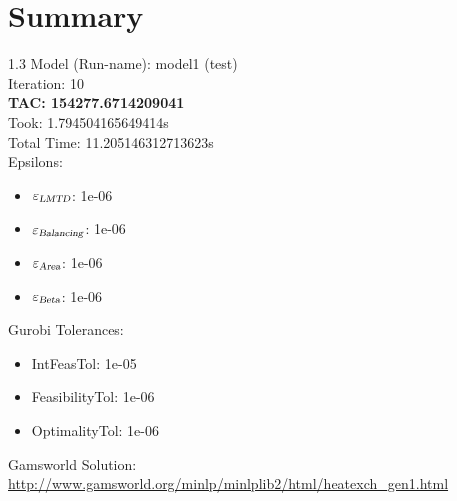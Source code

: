 \documentclass{article}%
\begin{document}
%
\normalsize%
\section{Summary}%
\thispagestyle{plain}%
\begin{spacing}{1.3}%
\Large%
Model (Run-name): model1 (test)\\%
Iteration: 10\\%
\textbf{TAC: 154277.6714209041}\\%
Took: 1.794504165649414s\\%
Total Time: 11.205146312713623s\\%
Epsilons:%
\begin{itemize}%
	\item $\varepsilon_{\textsl{LMTD}}$: 1e-06%
	\item $\varepsilon_{\textsl{Balancing}}$: 1e-06%
	\item $\varepsilon_{\textsl{Area}}$: 1e-06%
	\item $\varepsilon_{\textsl{Beta}}$: 1e-06%
\end{itemize}%
Gurobi Tolerances:%
\begin{itemize}%
	\item IntFeasTol: 1e-05%
	\item FeasibilityTol: 1e-06%
	\item OptimalityTol: 1e-06%
\end{itemize}%
\end{spacing}%
\normalsize%
Gamsworld Solution: \url{http://www.gamsworld.org/minlp/minlplib2/html/heatexch_gen1.html}%
%
\clearpage%
\end{document}
